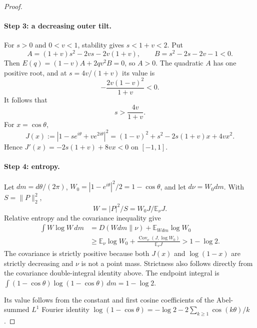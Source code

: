 \begin{proof}
\paragraph{Step 3: a decreasing outer tilt.}
For $s>0$ and $0<v<1$, stability gives $s<1+v<2$. Put
\[
 A=(1+v)s^2-2vs-2v(1+v),\qquad
 B=s^2-2s-2v-1<0.
\]
Then $E(q)=(1-v)A+2qv^2B=0$, so $A>0$. The quadratic $A$ has one positive root, and at $s=4v/(1+v)$ its value is
\[
 -\frac{2v(1-v)^2}{1+v}<0.
\]
It follows that
\[
 s>\frac{4v}{1+v}.
\]
For $x=\cos\theta$,
\[
 J(x):=|1-se^{i\theta}+ve^{2i\theta}|^2
 =(1-v)^2+s^2-2s(1+v)x+4vx^2.
\]
Hence $J'(x)=-2s(1+v)+8vx<0$ on $[-1,1]$.

\paragraph{Step 4: entropy.}
Let $dm=d\theta/(2\pi)$, $W_0=|1-e^{i\theta}|^2/2=1-\cos\theta$, and let $d\nu=W_0dm$. With $S=\|P\|_2^2$,
\[
 W=|P|^2/S=W_0J/\mathbb E_\nu J.
\]
Relative entropy and the covariance inequality give
\begin{align*}
 \int W\log W\,dm
 &=D(Wdm\|\nu)+\mathbb E_{Wdm}\log W_0\\
 &\ge \mathbb E_\nu\log W_0+
 \frac{\operatorname{Cov}_\nu(J,\log W_0)}{\mathbb E_\nu J}
 >1-\log2.
\end{align*}
The covariance is strictly positive because both $J(x)$ and $\log(1-x)$ are strictly decreasing and $\nu$ is not a point mass. Strictness also follows directly from the covariance double-integral
identity above. The endpoint integral is
$\int (1-\cos\theta)\log(1-\cos\theta)\,dm=1-\log2$.

 Its value follows from the constant and first cosine
coefficients of the Abel-summed $L^1$ Fourier identity
$\log(1-\cos\theta)=-\log2-2\sum_{k\ge1}\cos(k\theta)/k$.
\end{proof}

